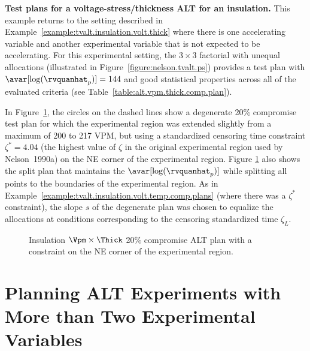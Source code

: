 \begin{example}
{\bf Test plans for a voltage-stress/thickness ALT for an insulation.}
\label{example:tvalt.insulation.volt.thick.plans}
This example returns to the setting described in
Example~\ref{example:tvalt.insulation.volt.thick} where there is one
accelerating variable and another experimental variable that is not
expected to be accelerating.  For this experimental setting, the $3
\times 3$ factorial with unequal allocations (illustrated in
Figure~\ref{figure:nelson.tvalt.ps}) provides a test
plan with $\avar[\log(\rvquanhat_{p})] = 144$ and good statistical
properties across all of the evaluated criteria (see
Table~\ref{table:alt.vpm.thick.comp.plan}).

In Figure~\ref{figure:insul.vpm.thick.20perct.zeta.ps}, the circles
on the dashed lines show a degenerate 20\% compromise test plan for
which the experimental region was extended slightly from a maximum
of 200 to 217 VPM, but using a standardized censoring time
constraint $\zeta^{*}=4.04$ (the highest value of $\zeta$ in the
original experimental region used by Nelson~1990a) on the NE corner
of the experimental region.  Figure
\ref{figure:insul.vpm.thick.20perct.zeta.ps} also shows the split plan that
maintains the $\avar[\log(\rvquanhat_{p})]$ while splitting all
points to the boundaries of the experimental region.  As in
Example~\ref{example:tvalt.insulation.volt.temp.comp.plans} (where
there was a $\zeta^{*}$ constraint), the slope $s$ of the degenerate
plan was chosen to equalize the allocations at 
conditions corresponding to the censoring standardized time $\zeta_{L}$.
\begin{figure}
\caption{Insulation $\Vpm \times \Thick$ 20\% 
compromise ALT plan with a constraint on the NE corner of the
experimental region.}
\label{figure:insul.vpm.thick.20perct.zeta.ps}
\end{figure}
\end{example}
\section{Planning ALT Experiments with More than Two Experimental Variables}
\label{section:alt.plan.multi.fact}

